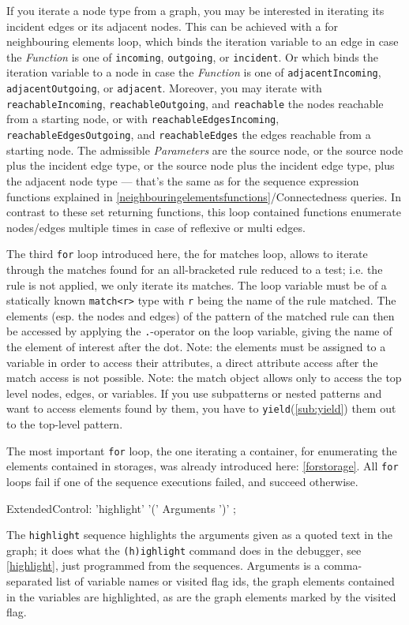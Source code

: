 If you iterate a node type from a graph, you may be interested in iterating its incident edges or its adjacent nodes.
This can be achieved with a for neighbouring elements loop, which binds the iteration variable to an edge in case the \emph{Function} is one of \texttt{incoming}, \texttt{outgoing}, or \texttt{incident}. 
Or which binds the iteration variable to a node in case the \emph{Function} is one of \texttt{adjacentIncoming}, \texttt{adjacentOutgoing}, or \texttt{adjacent}.
Moreover, you may iterate with \texttt{reachableIncoming}, \texttt{reachableOutgoing}, and \texttt{reachable} the nodes reachable from a starting node, or with \texttt{reachableEdgesIncoming}, \texttt{reachableEdgesOutgoing}, and \texttt{reachableEdges} the edges reachable from a starting node.
The admissible \emph{Parameters} are the source node, or the source node plus the incident edge type, or the source node plus the incident edge type, plus the adjacent node type ---
that's the same as for the sequence expression functions explained in \ref{neighbouringelementsfunctions}/Connectedness queries.
In contrast to these set returning functions, this loop contained functions enumerate nodes/edges multiple times in case of reflexive or multi edges.

The third \texttt{for} loop introduced here, the for matches loop, allows to iterate through the matches found for an all-bracketed rule reduced to a test; i.e. the rule is not applied, we only iterate its matches.
The loop variable must be of a statically known \texttt{match<r>} type with \texttt{r} being the name of the rule matched.
The elements (esp. the nodes and edges) of the pattern of the matched rule can then be accessed by applying the \texttt{.}-operator on the loop variable, giving the name of the element of interest after the dot.
Note: the elements must be assigned to a variable in order to access their attributes, a direct attribute access after the match access is not possible.
Note: the match object allows only to access the top level nodes, edges, or variables.
If you use subpatterns or nested patterns and want to access elements found by them, you have to \texttt{yield}(\ref{sub:yield}) them out to the top-level pattern.

The most important \texttt{for} loop, the one iterating a container, for enumerating the elements contained in storages, was already introduced here: \ref{forstorage}.
All \texttt{for} loops fail if one of the sequence executions failed, and succeed otherwise.

\begin{rail}
  ExtendedControl:
		'highlight' '(' Arguments ')'
    ;
\end{rail}
The \texttt{highlight} sequence highlights the arguments given as a quoted text in the graph;
it does what the \texttt{(h)ighlight} command does in the debugger, see \ref{highlight}, just programmed from the sequences. 
Arguments is a comma-separated list of variable names or visited flag ids, the graph elements contained in the variables are highlighted, as are the graph elements marked by the visited flag.

